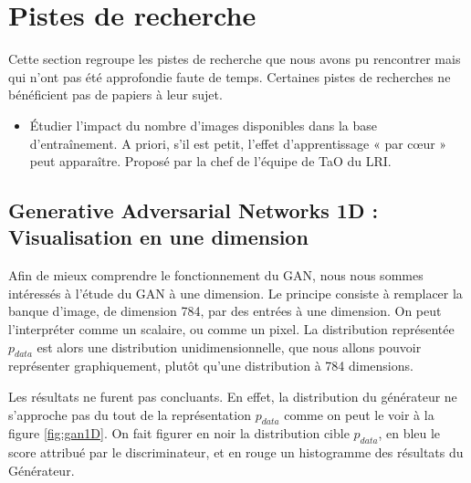\section{Pistes de recherche}
Cette section regroupe les pistes de recherche que nous avons pu rencontrer mais qui n'ont pas été approfondie faute de temps. Certaines pistes de recherches ne bénéficient pas de papiers à leur sujet.
\begin{itemize}
\item Étudier l’impact du nombre d’images disponibles dans la base d’entraînement. A priori, s’il est petit, l’effet d’apprentissage « par cœur » peut apparaître. Proposé par la chef de l’équipe de TaO du LRI.
\end{itemize}

\subsection{Generative Adversarial Networks 1D : Visualisation en une dimension}

Afin de mieux comprendre le fonctionnement du GAN, nous nous sommes intéressés à l'étude du GAN à une dimension.  Le principe consiste à remplacer la banque d'image, de dimension 784, par des entrées à une dimension. On peut l'interpréter comme un scalaire, ou comme un pixel. La distribution représentée $p_{data}$ est alors une distribution unidimensionnelle, que nous allons pouvoir représenter graphiquement, plutôt qu'une distribution à 784 dimensions.

Les résultats ne furent pas concluants. En effet, la distribution du générateur ne s'approche pas du tout de la représentation $p_{data}$ comme on peut le voir à la figure \ref{fig:gan1D}. On fait figurer en noir la distribution cible $p_{data}$, en bleu le score attribué par le discriminateur, et en rouge un histogramme des résultats du Générateur.

